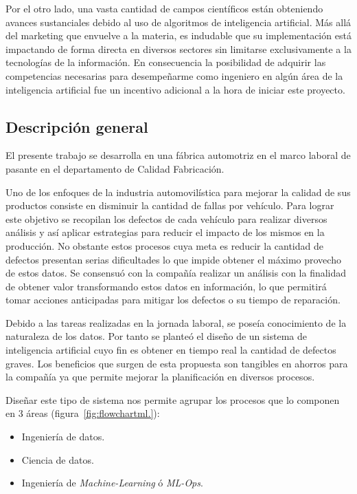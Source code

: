 \documentclass[a4paper,12pt]{article}
\begin{document}
Por el otro lado, una vasta cantidad de campos científicos están obteniendo avances sustanciales debido al uso de algoritmos de inteligencia artificial. Más allá del marketing que envuelve a la materia, es indudable que su implementación está impactando de forma directa en diversos sectores sin limitarse exclusivamente a la tecnologías de la información. En consecuencia la posibilidad de adquirir las competencias necesarias para desempeñarme como ingeniero en algún área de la inteligencia artificial fue un incentivo adicional a la hora de iniciar este proyecto.

\subsection{Descripción general}

El presente trabajo se desarrolla en una fábrica automotriz en el marco laboral de pasante en el departamento de Calidad Fabricación.

Uno de los enfoques de la industria automovilística para mejorar la calidad de sus productos consiste en disminuir la cantidad de fallas por vehículo. Para lograr este objetivo se recopilan los defectos de cada vehículo para realizar diversos análisis y así aplicar estrategias para reducir el impacto de los mismos en la producción. No obstante estos procesos cuya meta es reducir la cantidad de defectos presentan serias dificultades lo que impide obtener el máximo provecho de estos datos. Se consensuó con la compañía realizar un análisis con la finalidad de obtener valor transformando estos datos en información, lo que permitirá tomar acciones anticipadas para mitigar los defectos o su tiempo de reparación.

Debido a las tareas realizadas en la jornada laboral, se poseía conocimiento de la naturaleza de los datos. Por tanto se planteó el diseño de un sistema de inteligencia artificial cuyo fin es obtener en tiempo real la cantidad de defectos graves. Los beneficios que surgen de esta propuesta son tangibles en ahorros para la compañía ya que permite mejorar la planificación en diversos procesos.

Diseñar este tipo de sistema nos permite agrupar los procesos que lo componen en 3 áreas (figura~\ref{fig:flowchartml.}):
\begin{itemize}[noitemsep, topsep=2pt]
	\item Ingeniería de datos.
	\item Ciencia de datos.
	\item Ingeniería de \textit{Machine-Learning} ó \textit{ML-Ops}.
\end{itemize}
\end{document}
